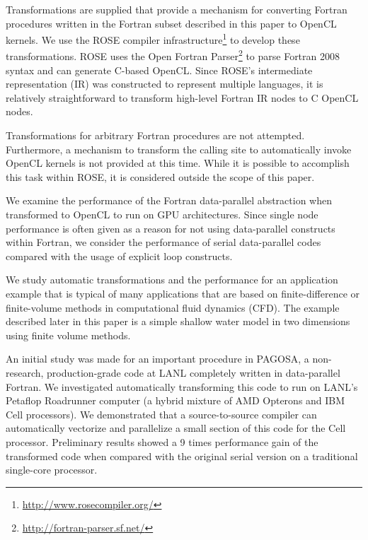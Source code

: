 Transformations are supplied that provide a mechanism for converting
Fortran procedures written in the Fortran subset described in this
paper to OpenCL kernels.  We use the ROSE compiler
infrastructure\footnote{\url{http://www.rosecompiler.org/}} to
develop these transformations.  ROSE uses the Open Fortran
Parser\footnote{\url{http://fortran-parser.sf.net/}} to parse
Fortran 2008 syntax and can generate C-based OpenCL.  Since ROSE's
intermediate representation (IR) was constructed to represent multiple
languages, it is relatively straightforward to transform high-level
Fortran IR nodes to C OpenCL nodes.


Transformations for arbitrary Fortran procedures are not attempted.
Furthermore, a mechanism to transform the calling site to
automatically invoke OpenCL kernels is not provided at this time.
While it is possible to accomplish this task within ROSE, it is
considered outside the scope of this paper.

We examine the performance of the Fortran data-parallel abstraction
when transformed to OpenCL to run on GPU architectures.  Since single
node performance is often given as a reason for not using
data-parallel constructs within Fortran, we consider the performance
of serial data-parallel codes compared with the usage of explicit loop
constructs.

We study automatic transformations and the performance for an
application example that is typical of many applications that are
based on finite-difference or finite-volume methods in computational
fluid dynamics (CFD).  The example described later in this paper is a
simple shallow water model in two dimensions using finite volume
methods.

An initial study was made for an important procedure in PAGOSA, a
non-research, production-grade code at LANL completely written in
data-parallel Fortran.  We investigated automatically transforming
this code to run on LANL's Petaflop Roadrunner computer (a hybrid
mixture of AMD Opterons and IBM Cell processors).  We demonstrated that a
source-to-source compiler can automatically vectorize and parallelize
a small section of this code for the Cell processor.  Preliminary results
showed a 9 times performance gain of the transformed code when compared
with the original serial version on a traditional single-core processor.

